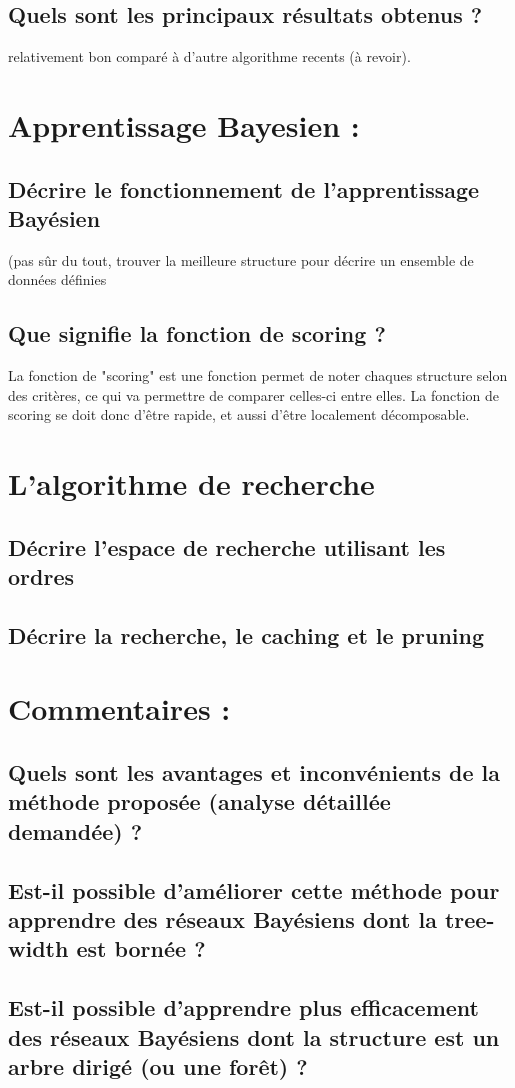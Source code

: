 \documentclass[french,a4paper]{article}
\begin{document}
\subsection{Quels sont les principaux résultats obtenus ?}
relativement bon comparé à d'autre algorithme recents (à revoir).

\section{Apprentissage Bayesien :}
\subsection{Décrire le fonctionnement de l'apprentissage Bayésien}
(pas sûr du tout, trouver la meilleure structure pour décrire un ensemble de données définies

\subsection{Que signifie la fonction de scoring ?}
La fonction de "scoring" est une fonction permet de noter chaques structure selon des critères, ce qui va permettre de comparer celles-ci entre elles.
La fonction de scoring se doit donc d'être rapide, et aussi d'être localement décomposable.

\section{L'algorithme de recherche}
\subsection{Décrire l'espace de recherche utilisant les ordres}


\subsection{Décrire la recherche, le caching et le pruning}


\section{Commentaires :}
\subsection{Quels sont les avantages et inconvénients de la méthode proposée (analyse détaillée demandée) ?}
\subsection{Est-il possible d'améliorer cette méthode pour apprendre des réseaux Bayésiens dont la tree-width est bornée ?}
\subsection{Est-il possible d'apprendre plus efficacement des réseaux Bayésiens dont la structure est un arbre dirigé (ou une forêt) ?}
\end{document}
